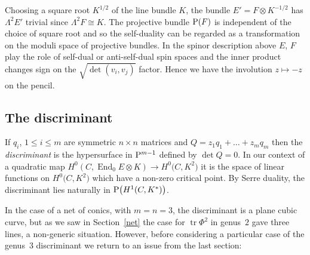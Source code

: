 \documentclass[pdftex]{sigma}
\numberwithin{equation}{section}
\begin{document}
\begin{Remark}
 Choosing a square root $K^{1/2}$ of the line bundle $K$, the bundle $E'=F\otimes K^{-1/2}$ has $\Lambda^2E'$ trivial since $\Lambda^2F\cong K$. The projective bundle ${\rm P}(F)$ is independent of the choice of square root and so the self-duality can be regarded as a transformation on the moduli space of projective bundles. In the spinor description above $E$, $F$ play the role of self-dual or anti-self-dual spin spaces and the inner product changes sign on the $\sqrt{\det(v_i,v_j)}$ factor. Hence we have the involution
$z\mapsto -z$ on the pencil.
\end{Remark}

\subsection{The discriminant}
If $q_i$, $1\le i\le m$ are symmetric $n\times n$ matrices and $Q=z_1q_1+\dots + z_mq_m$ then the {\it discriminant} is the hypersurface in ${\rm P}^{m-1}$ defined by $\det Q=0$. In our context of a quadratic map $H^0(C,\operatorname{End}_0E\otimes K)\rightarrow H^0\big(C,K^2\big)$ it is the space of linear functions on $H^0\big(C,K^2\big)$ which have a non-zero critical point. By Serre duality, the discriminant lies naturally in ${\rm P}\big(H^1(C,K^*)\big)$.

In the case of a net of conics, with $m=n=3$, the discriminant is a plane cubic curve, but as we saw in Section~\ref{net} the case for $\operatorname{tr} \Phi^2$ in genus~$2$ gave three lines, a non-generic situation. However, before considering a particular case of the genus~$3$ discriminant
 we return to an issue from the last section:
\end{document}
